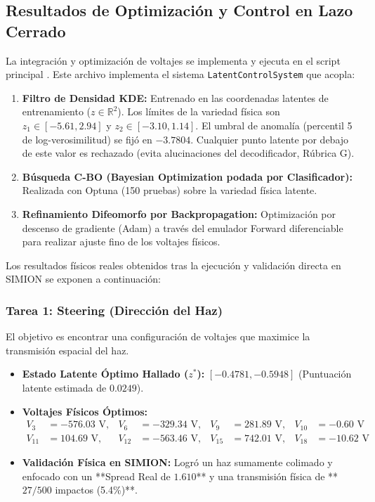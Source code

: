 \documentclass[12pt,letterpaper]{article}
\begin{document}
\subsection{Resultados de Optimización y Control en Lazo Cerrado}
La integración y optimización de voltajes se implementa y ejecuta en el script principal \textbf{}. Este archivo implementa el sistema \texttt{LatentControlSystem} que acopla:
\begin{enumerate}
    \item \textbf{Filtro de Densidad KDE:} Entrenado en las coordenadas latentes de entrenamiento ($z \in \mathbb{R}^2$). Los límites de la variedad física son $z_1 \in [-5.61, 2.94]$ y $z_2 \in [-3.10, 1.14]$. El umbral de anomalía (percentil 5 de log-verosimilitud) se fijó en \textbf{$-3.7804$}. Cualquier punto latente por debajo de este valor es rechazado (evita alucinaciones del decodificador, Rúbrica G).
    \item \textbf{Búsqueda C-BO (Bayesian Optimization podada por Clasificador):} Realizada con Optuna (150 pruebas) sobre la variedad física latente.
    \item \textbf{Refinamiento Difeomorfo por Backpropagation:} Optimización por descenso de gradiente (Adam) a través del emulador Forward diferenciable para realizar ajuste fino de los voltajes físicos.
\end{enumerate}

Los resultados físicos reales obtenidos tras la ejecución y validación directa en SIMION se exponen a continuación:

\subsubsection{Tarea 1: Steering (Dirección del Haz)}
El objetivo es encontrar una configuración de voltajes que maximice la transmisión espacial del haz.
\begin{itemize}
    \item \textbf{Estado Latente Óptimo Hallado ($z^*$):} $[-0.4781, -0.5948]$ (Puntuación latente estimada de $0.0249$).
    \item \textbf{Voltajes Físicos Óptimos:} 
    \begin{align*}
        V_3 &= -576.03\text{ V}, & V_6 &= -329.34\text{ V}, & V_9 &= 281.89\text{ V}, & V_{10} &= -0.60\text{ V} \\
        V_{11} &= 104.69\text{ V}, & V_{12} &= -563.46\text{ V}, & V_{15} &= 742.01\text{ V}, & V_{18} &= -10.62\text{ V}
    \end{align*}
    \item \textbf{Validación Física en SIMION:} Logró un haz sumamente colimado y enfocado con un **Spread Real de $1.610$** y una transmisión física de **$27/500$ impactos (5.4\%)**.
\end{itemize}
\end{document}
